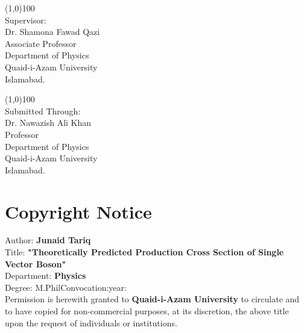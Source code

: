 \documentclass[a4paper,12pt]{report}
\numberwithin{equation}{section}
\begin{document}
   
    
 \vspace{3cm}
    \begin{flushleft}
        \line(1,0){100} \\
        Supervisor: \\[0cm]
        Dr. Shamona Fawad Qazi\\
        Associate Professor \\
        Department of Physics\\
        Quaid-i-Azam University\\
        Islamabad.
    \end{flushleft} 
    
    \vspace{3cm}


    \begin{flushleft}
    
   
        \line(1,0){100} \\
        Submitted Through: \\[0cm]
        Dr. Nawazish Ali Khan\\
        Professor\\
        Department of Physics\\
        Quaid-i-Azam University\\
        Islamabad.        
    \end{flushleft}
    


    \newpage
    \chapter*{Copyright Notice} %
    \label{cha:copyright_notice}
    \begin{flushright}
    \date{}
    \end{flushright}
    \begin{flushleft}
    Author:\hspace{2cm}   \textbf{Junaid Tariq}\\
    Title:\hspace{2cm}    \textbf{"Theoretically Predicted Production Cross Section of Single Vector Boson"}\\
    Department:\hspace{2cm} \textbf{Physics}\\
    Degree:\hspace{2cm} M.Phil\hspace{2cm}Convocation:\hspace{2cm}year:\\[2cm]
    
    Permission is herewith granted to \textbf{Quaid-i-Azam University} to circulate and to have copied for non-commercial purposes, at its discretion, the above title upon the request of individuals or institutions.\\[4cm]
    
  \end{flushleft}
     
\end{document}
